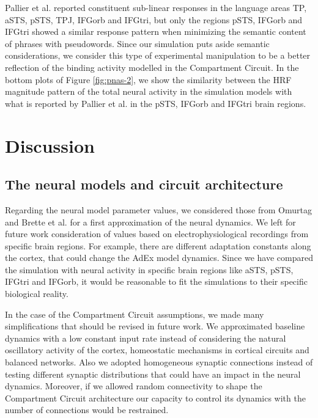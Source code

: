 \documentclass[10pt]{article}
\begin{document}
Pallier et al. reported constituent sub-linear responses in the language areas TP, aSTS, pSTS, TPJ, IFGorb and IFGtri, but only the regions pSTS, IFGorb and IFGtri showed a similar response pattern when minimizing the semantic content of phrases with pseudowords.
Since our simulation puts aside semantic considerations, we consider this type of experimental manipulation to be a better reflection of the binding activity modelled in the Compartment Circuit.
In the bottom plots of Figure \ref{fig:pnas-2}, we show the similarity between the HRF magnitude pattern of the total neural activity in the simulation models with what is reported by Pallier et al. in the pSTS, IFGorb and IFGtri brain regions.


\section{Discussion}
{\label{sec:discussion}}


\subsection{The neural models and circuit architecture}

Regarding the neural model parameter values, we considered those from Omurtag\cite{omurtag2000simulation} and Brette et al. \cite{Brette_2005} for a first approximation of the neural dynamics. We left for future work consideration of values based on electrophysiological recordings from specific brain regions.
For example, there are different adaptation constants along the cortex, that could change the AdEx model dynamics.
Since we have compared the simulation with neural activity in specific brain regions like aSTS, pSTS, IFGtri and IFGorb, it would be reasonable to fit the simulations to their specific biological reality.

In the case of the Compartment Circuit assumptions, we made many simplifications that should be revised in future work.
We approximated baseline dynamics with a low constant input rate instead of considering the natural oscillatory activity of the cortex, homeostatic mechanisms in cortical circuits\cite{turrigiano2011too} and balanced networks\cite{Wolf_2014}.
Also we adopted homogeneous synaptic connections instead of testing different synaptic distributions that could have an impact in the neural dynamics.
Moreover, if we allowed random connectivity to shape the Compartment Circuit architecture our capacity to control its dynamics with the number of connections would be restrained.
\end{document}
